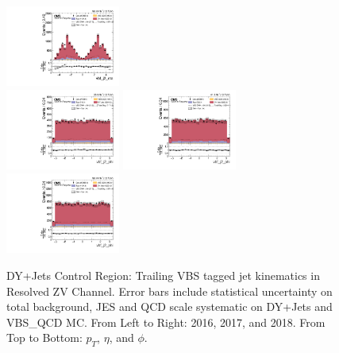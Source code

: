 \begin{figure}[!ht]
  \includegraphics[width=0.335\textwidth]{analysis_plots/2018_zjj/cr_vjets_l/vbf_j2_eta.pdf} \hspace{-10pt} \\
  \includegraphics[width=0.335\textwidth]{analysis_plots/2016_zjj/cr_vjets_l/vbf_j2_phi.pdf} \hspace{-10pt}
  \includegraphics[width=0.335\textwidth]{analysis_plots/2017_zjj/cr_vjets_l/vbf_j2_phi.pdf} \hspace{-10pt}
  \includegraphics[width=0.335\textwidth]{analysis_plots/2018_zjj/cr_vjets_l/vbf_j2_phi.pdf} \hspace{-10pt} \\
  \caption[DY+Jets Control Region: Trailing VBS tagged jet kinematics in Resolved ZV Channel]%
  {DY+Jets Control Region: Trailing VBS tagged jet kinematics in Resolved ZV Channel.
    Error bars include statistical uncertainty on total background,
    JES and QCD scale systematic on DY+Jets and VBS\_QCD MC\@. From Left to Right: 2016,
    2017, and 2018. From Top to Bottom: \( p_T \), \( \eta \), and \( \phi \).}%
  \label{fig:zjj-cr-vjets-l-vbs2-pt-eta-m}
\end{figure}

